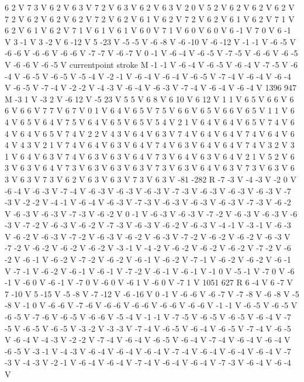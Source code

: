 {{6 2 V
7 3 V
6 2 V
6 3 V
7 2 V
6 3 V
6 2 V
6 3 V
2 0 V
5 2 V
6 2 V
6 2 V
6 2 V
7 2 V
6 2 V
6 2 V
6 2 V
7 2 V
6 2 V
6 1 V
6 2 V
7 2 V
6 2 V
6 1 V
6 2 V
7 1 V
6 2 V
6 1 V
6 2 V
7 1 V
6 1 V
6 1 V
6 0 V
7 1 V
6 0 V
6 0 V
6 -1 V
7 0 V
6 -1 V
3 -1 V
3 -2 V
6 -12 V
5 -23 V
-5 -5 V
-6 -8 V
-6 -10 V
-6 -12 V
-1 -1 V
-6 -5 V
-6 -6 V
-6 -6 V
-6 -6 V
-7 -7 V
-6 -7 V
0 -1 V
-6 -4 V
-6 -5 V
-7 -5 V
-6 -6 V
-6 -5 V
-6 -6 V
-6 -5 V
currentpoint stroke M
-1 -1 V
-6 -4 V
-6 -5 V
-6 -4 V
-7 -5 V
-6 -4 V
-6 -5 V
-6 -5 V
-5 -4 V
-2 -1 V
-6 -4 V
-6 -4 V
-6 -5 V
-7 -4 V
-6 -4 V
-6 -4 V
-6 -5 V
-7 -4 V
-2 -2 V
-4 -3 V
-6 -4 V
-6 -3 V
-7 -4 V
-6 -4 V
-6 -4 V
1396 947 M
-3 1 V
-3 2 V
-6 12 V
-5 23 V
5 5 V
6 8 V
6 10 V
6 12 V
1 1 V
6 5 V
6 6 V
6 6 V
6 6 V
7 7 V
6 7 V
0 1 V
6 4 V
6 5 V
7 5 V
6 6 V
6 5 V
6 6 V
6 5 V
1 1 V
6 4 V
6 5 V
6 4 V
7 5 V
6 4 V
6 5 V
6 5 V
5 4 V
2 1 V
6 4 V
6 4 V
6 5 V
7 4 V
6 4 V
6 4 V
6 5 V
7 4 V
2 2 V
4 3 V
6 4 V
6 3 V
7 4 V
6 4 V
6 4 V
7 4 V
6 4 V
6 4 V
4 3 V
2 1 V
7 4 V
6 4 V
6 3 V
6 4 V
7 4 V
6 3 V
6 4 V
6 4 V
7 4 V
3 2 V
3 1 V
6 4 V
6 3 V
7 4 V
6 3 V
6 3 V
6 4 V
7 3 V
6 4 V
6 3 V
6 4 V
2 1 V
5 2 V
6 3 V
6 3 V
6 4 V
7 3 V
6 3 V
6 3 V
6 3 V
7 3 V
6 3 V
6 4 V
6 3 V
7 3 V
6 3 V
6 3 V
6 3 V
7 3 V
6 2 V
6 3 V
6 3 V
7 3 V
6 3 V
-81 -282 R
-7 -3 V
-4 -3 V
-2 0 V
-6 -4 V
-6 -3 V
-7 -4 V
-6 -3 V
-6 -3 V
-6 -3 V
-7 -3 V
-6 -3 V
-6 -3 V
-6 -3 V
-7 -3 V
-2 -2 V
-4 -1 V
-6 -4 V
-6 -3 V
-7 -3 V
-6 -3 V
-6 -3 V
-6 -3 V
-7 -3 V
-6 -2 V
-6 -3 V
-6 -3 V
-7 -3 V
-6 -2 V
0 -1 V
-6 -3 V
-6 -3 V
-7 -2 V
-6 -3 V
-6 -3 V
-6 -3 V
-7 -2 V
-6 -3 V
-6 -2 V
-7 -3 V
-6 -3 V
-6 -2 V
-6 -3 V
-4 -1 V
-3 -1 V
-6 -3 V
-6 -2 V
-6 -3 V
-7 -2 V
-6 -3 V
-6 -2 V
-6 -3 V
-7 -2 V
-6 -2 V
-6 -2 V
-6 -3 V
-7 -2 V
-6 -2 V
-6 -2 V
-6 -2 V
-3 -1 V
-4 -2 V
-6 -2 V
-6 -2 V
-6 -2 V
-7 -2 V
-6 -2 V
-6 -1 V
-6 -2 V
-7 -2 V
-6 -2 V
-6 -1 V
-6 -2 V
-7 -1 V
-6 -2 V
-6 -2 V
-6 -1 V
-7 -1 V
-6 -2 V
-6 -1 V
-6 -1 V
-7 -2 V
-6 -1 V
-6 -1 V
-1 0 V
-5 -1 V
-7 0 V
-6 -1 V
-6 0 V
-6 -1 V
-7 0 V
-6 0 V
-6 1 V
-6 0 V
-7 1 V
1051 627 R
6 -4 V
6 -7 V
7 -10 V
5 -15 V
-5 -8 V
-7 -12 V
-6 -16 V
0 -1 V
-6 -6 V
-6 -7 V
-7 -8 V
-6 -8 V
-5 -8 V
-1 0 V
-6 -6 V
-7 -6 V
-6 -6 V
-6 -6 V
-6 -6 V
-6 -6 V
-1 -1 V
-6 -5 V
-6 -5 V
-6 -5 V
-7 -6 V
-6 -5 V
-6 -6 V
-5 -4 V
-1 -1 V
-7 -5 V
-6 -5 V
-6 -5 V
-6 -4 V
-7 -5 V
-6 -5 V
-6 -5 V
-3 -2 V
-3 -3 V
-7 -4 V
-6 -5 V
-6 -4 V
-6 -5 V
-7 -4 V
-6 -5 V
-6 -4 V
-4 -3 V
-2 -2 V
-7 -4 V
-6 -4 V
-6 -5 V
-6 -4 V
-7 -4 V
-6 -4 V
-6 -4 V
-6 -5 V
-3 -1 V
-4 -3 V
-6 -4 V
-6 -4 V
-6 -4 V
-7 -4 V
-6 -4 V
-6 -4 V
-6 -4 V
-7 -3 V
-4 -3 V
-2 -1 V
-6 -4 V
-6 -4 V
-7 -4 V
-6 -4 V
-6 -4 V
-7 -3 V
-6 -4 V
-6 -4 V
}}
